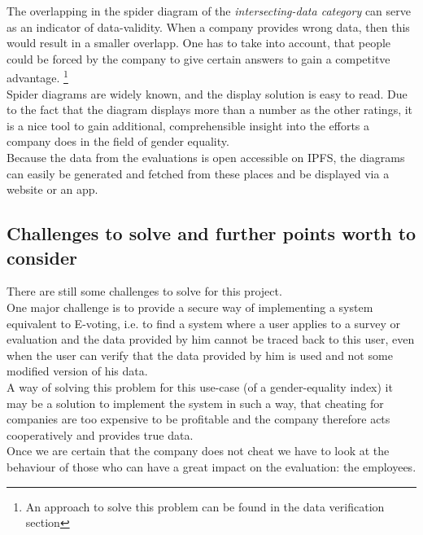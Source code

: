 \documentclass[portrait,a4paper]{article}
\begin{document}
		The overlapping in the spider diagram of the \textit{intersecting-data category} can serve as an 
		indicator of data-validity. When a company provides wrong data, then this would result in a smaller overlapp. 
		One has to take into account, that people could be forced by the company to give certain answers 
		to gain a competitve advantage. \footnote{An approach to solve this problem can be found in the data verification section}\\

		Spider diagrams are widely known, and the display solution is easy to read. 
		Due to the fact that the diagram displays more than a number as the other ratings, 
		it is a nice tool to gain additional, comprehensible insight into the efforts a company does 
		in the field of gender equality.\\

		Because the data from the evaluations is open accessible on IPFS, the diagrams can easily be generated and 
		fetched from these places and be displayed via a website or an app.

	\subsection{Challenges to solve and further points worth to consider}
		There are still some challenges to solve for this project.\\
		
		One major challenge is to provide a secure way of implementing a system equivalent to E-voting, 
		i.e. to find a system where a user applies to a survey or evaluation and the data provided by 
		him cannot be traced back to this user, even when the user can verify that the data provided 
		by him is used and not some modified version of his data.\\
		A way of solving this problem for this use-case (of a gender-equality index) it may be a 
		solution to implement the system in such a way, that cheating for companies are too expensive 
		to be profitable and the company therefore acts cooperatively and provides true data.\\
		Once we are certain that the company does not cheat we have to look at the behaviour 
		of those who can have a great impact on the evaluation: the employees.\\
		
\end{document}
